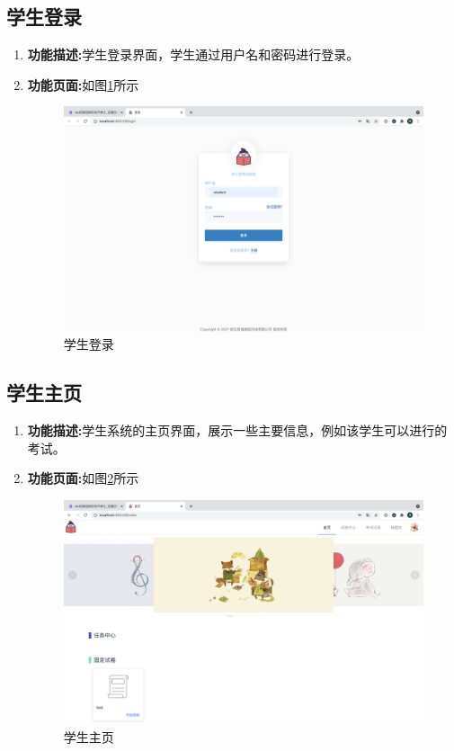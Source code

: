 \subsection{学生登录}
\begin{enumerate}
	\item[] \textbf{功能描述:}学生登录界面，学生通过用户名和密码进行登录。
	\item[] \textbf{功能页面:}如图\ref{figure:sdenglu}所示 \\
		\begin{figure}[H]
			\centering
			\includegraphics[width=1.0\textwidth,keepaspectratio]{data/chapter-5/student/denglu.png}
			\caption{学生登录}
			\label{figure:sdenglu}
		\end{figure}
\end{enumerate}

\subsection{学生主页}
\begin{enumerate}
	\item[] \textbf{功能描述:}学生系统的主页界面，展示一些主要信息，例如该学生可以进行的考试。
	\item[] \textbf{功能页面:}如图\ref{figure:szhuye}所示 \\
		\begin{figure}[H]
			\centering
			\includegraphics[width=1.0\textwidth,keepaspectratio]{data/chapter-5/student/zhuye.png}
			\caption{学生主页}
			\label{figure:szhuye}
		\end{figure}
\end{enumerate}


